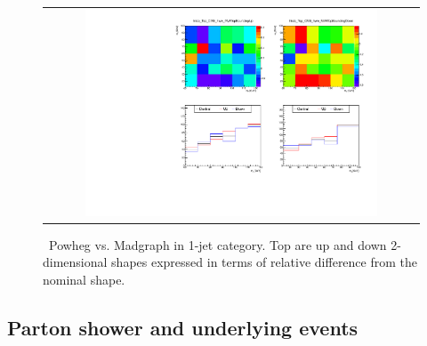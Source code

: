\begin{figure}[htp]
\centering
\begin{tabular}{c}
\includegraphics[width=0.8\textwidth]{figures/histo_Top_CMS_hww_MVATopBounding_1j_zoom.pdf}
\end{tabular}
\caption{ \topbkg\ Powheg vs. Madgraph in 1-jet category.
         Top are up and down 2-dimensional shapes expressed in terms of relative 
         difference from the nominal shape.}
\label{fig:alter_top}
\end{figure}

\subsection{Parton shower and underlying events}

